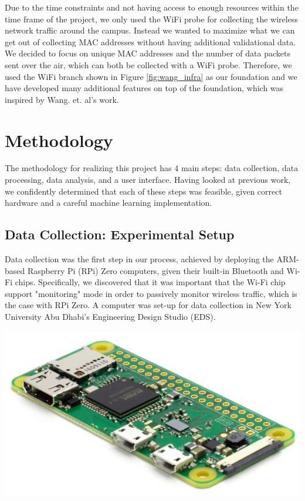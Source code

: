 \documentclass[journal, 12pt]{IEEEtran}
\begin{document}
\noindent Due to the time constraints and not having access to enough resources within the time frame of the project, we only used the WiFi probe for collecting the wireless network traffic around the campus. Instead we wanted to maximize what we can get out of collecting MAC addresses without having additional validational data. We decided to focus on unique MAC addresses and the number of data packets sent over the air, which can both be collected with a WiFi probe. Therefore, we used the WiFi branch shown in Figure \ref{fig:wang_infra} as our foundation and we have developed many additional features on top of the foundation, which was inspired by Wang. et. al's work.





\section{Methodology}
\noindent The methodology for realizing this project has 4 main steps: data collection, data processing, data analysis, and a user interface. Having looked at previous work, we confidently determined that each of these steps was feasible, given correct hardware and a careful machine learning implementation.

\subsection{Data Collection: Experimental Setup}
\noindent Data collection was the first step in our process, achieved by deploying the ARM-based Raspberry Pi (RPi) Zero computers, given their built-in Bluetooth and Wi-Fi chips. Specifically, we discovered that it was important that the Wi-Fi chip support "monitoring" mode in order to passively monitor wireless traffic, which is the case with RPi Zero. A computer was set-up for data collection in New York University Abu Dhabi's Engineering Design Studio (EDS). 

\begingroup
    \center
    \medskip
    \includegraphics[width=0.6\columnwidth]{report/interim_report/images/raspi.png}
    \label{fig:raspi}
    \medskip
\endgroup
\end{document}

